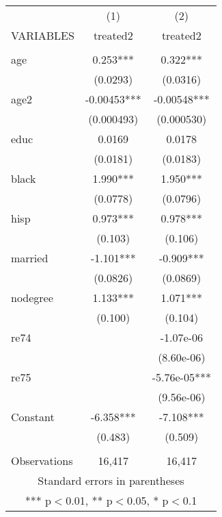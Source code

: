 \begin{tabular}{lcc} \hline
 & (1) & (2) \\
VARIABLES & treated2 & treated2 \\ \hline
 &  &  \\
age & 0.253*** & 0.322*** \\
 & (0.0293) & (0.0316) \\
age2 & -0.00453*** & -0.00548*** \\
 & (0.000493) & (0.000530) \\
educ & 0.0169 & 0.0178 \\
 & (0.0181) & (0.0183) \\
black & 1.990*** & 1.950*** \\
 & (0.0778) & (0.0796) \\
hisp & 0.973*** & 0.978*** \\
 & (0.103) & (0.106) \\
married & -1.101*** & -0.909*** \\
 & (0.0826) & (0.0869) \\
nodegree & 1.133*** & 1.071*** \\
 & (0.100) & (0.104) \\
re74 &  & -1.07e-06 \\
 &  & (8.60e-06) \\
re75 &  & -5.76e-05*** \\
 &  & (9.56e-06) \\
Constant & -6.358*** & -7.108*** \\
 & (0.483) & (0.509) \\
 &  &  \\
 Observations & 16,417 & 16,417 \\ \hline
\multicolumn{3}{c}{ Standard errors in parentheses} \\
\multicolumn{3}{c}{ *** p$<$0.01, ** p$<$0.05, * p$<$0.1} \\
\end{tabular}

